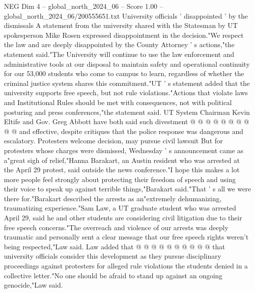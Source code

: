 \begin{textsample}{NEG Dim 4 – global\_north\_2024\_06 – Score 1.00 – global\_north\_2024\_06/200555651.txt}
University officials ' disappointed ' by the dismissals A statement from the university shared with the Statesman by UT spokesperson Mike Rosen expressed disappointment in the decision."We respect the law and are deeply disappointed by the County Attorney ' s actions,"the statement said."The University will continue to use the law enforcement and administrative tools at our disposal to maintain safety and operational continuity for our 53,000 students who come to campus to learn, regardless of whether the criminal justice system shares this commitment."UT ' s statement added that the university supports free speech, but not rule violations."Actions that violate laws and Institutional Rules should be met with consequences, not with political posturing and press conferences,"the statement said.
UT System Chairman Kevin Eltife and Gov.
Greg Abbott have both said such divestment @ @ @ @ @ @ @ @ @ @ and effective, despite critiques that the police response was dangerous and escalatory.
Protesters welcome decision, may pursue civil lawsuit But for protesters whose charges were dismissed, Wednesday ' s announcement came as a"great sigh of relief,"Hanna Barakart, an Austin resident who was arrested at the April 29 protest, said outside the news conference."I hope this makes a lot more people feel strongly about protecting their freedom of speech and using their voice to speak up against terrible things,"Barakart said."That ' s all we were there for."Barakart described the arrests as an"extremely dehumanizing, traumatizing experience."Sam Law, a UT graduate student who was arrested April 29, said he and other students are considering civil litigation due to their free speech concerns."The overreach and violence of our arrests was deeply traumatic and personally sent a clear message that our free speech rights weren't being respected,"Law said.
Law added that @ @ @ @ @ @ @ @ @ @ that university officials consider this development as they pursue disciplinary proceedings against protesters for alleged rule violations the students denied in a collective letter."No one should be afraid to stand up against an ongoing genocide,"Law said.

\end{textsample}
